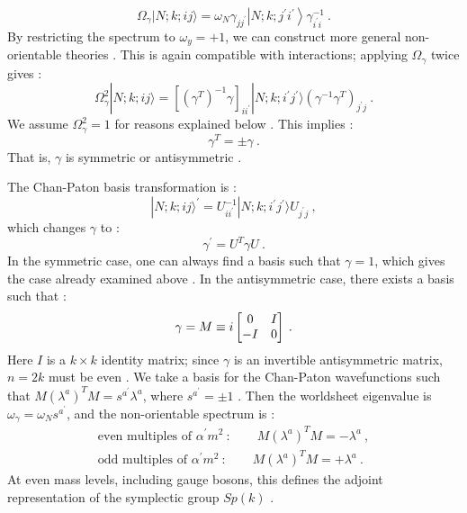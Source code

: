 \begin{equation}
	\Omega_{\gamma}|N ; k ; i j\rangle=\omega_{N} \gamma_{j j^{\prime}}\left|N ; k ; j^{\prime} i^{\prime}\right\rangle \gamma_{i^{\prime} i}^{-1} \:. \label{6.5.25}
\end{equation}
By restricting the spectrum to $\omega_{y}=+1$, we can construct more general non-orientable theories . This is again compatible with interactions; applying $\Omega_{\gamma}$ twice gives :
\begin{equation}
	\Omega_{\gamma}^{2}|N ; k ; i j\rangle= [(\gamma^{T})^{-1} \gamma]_{i i^{\prime}} |N ; k ; i^{\prime} j^{\prime}\rangle (\gamma^{-1} \gamma^{T})_{j^{\prime} j} \:. \label{6.5.26}
\end{equation}
We assume $\Omega_{\gamma}^{2}=1$ for reasons explained below . This implies :
\begin{equation}
	\gamma^{T}=\pm \gamma \:. \label{6.5.27}
\end{equation}
That is, $\gamma$ is symmetric or antisymmetric .

The Chan-Paton basis transformation is :
\begin{equation}
	|N ; k ; i j\rangle^{\prime}=U_{i i^{\prime}}^{-1} |N ; k ; i^{\prime} j^{\prime}\rangle U_{j^{\prime} j} \:, \label{6.5.28}
\end{equation}
which changes $\gamma$ to :
\begin{equation}
	\gamma^{\prime}=U^{T} \gamma U \:. \label{6.5.29}
\end{equation}
In the symmetric case, one can always find a basis such that $\gamma=1$, which gives the case already examined above . In the antisymmetric case, there exists a basis such that :
\begin{equation}
	\gamma=M \equiv i\begin{bmatrix}
		0 & I \\
		-I & 0
	\end{bmatrix} \:. \label{6.5.30}
\end{equation}
Here $I$ is a $k \times k$ identity matrix; since $\gamma$ is an invertible antisymmetric matrix, $n=2 k$ must be even . We take a basis for the Chan-Paton wavefunctions such that $M(\lambda^{a})^{T} M=s^{a^{\prime}} \lambda^{a}$, where $s^{a^{\prime}}=\pm 1$ . Then the worldsheet eigenvalue is $\omega_{\gamma}=\omega_{N} s^{a^{\prime}}$, and the non-orientable spectrum is :
\begin{subequations} \label{6.5.31}
	\begin{align}
		\text{even multiples of } \alpha^{\prime} m^{2} \:: \qquad   M(\lambda^{a})^{T} M=-\lambda^{a} \:, \label{6.5.31a} \\
		\text{odd multiples of } \alpha^{\prime} m^{2} \:: \qquad   M(\lambda^{a})^{T} M=+\lambda^{a} \:. \label{6.5.31b}
	\end{align}
\end{subequations}
At even mass levels, including gauge bosons, this defines the adjoint representation of the symplectic group $Sp(k)$ .

